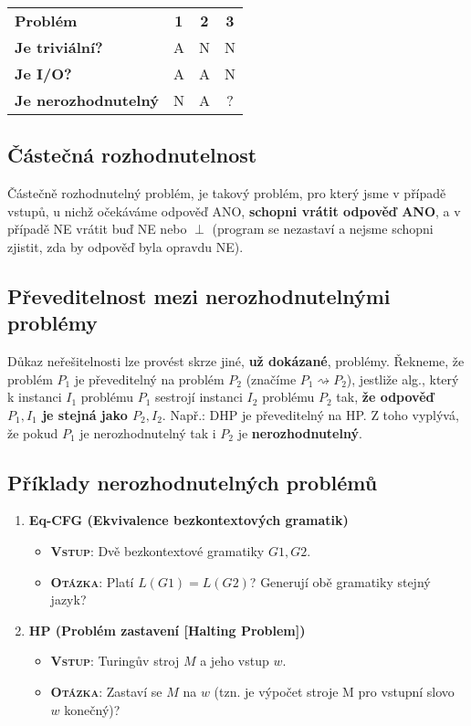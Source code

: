 \begin{table}[H]
    \centering
    \begin{tabular}{l|c|c|c}
        \textbf{Problém}            & \textbf{1} & \textbf{2} & \textbf{3} \\\hhline
        \textbf{Je triviální?}      & A          & N          & N          \\
        \textbf{Je I/O?}            & A          & A          & N          \\
        \textbf{Je nerozhodnutelný} & N          & A          & ?
    \end{tabular}
\end{table}

\subsection{Částečná rozhodnutelnost}
Částečně rozhodnutelný problém, je takový problém, pro který jsme v případě vstupů, u nichž očekáváme odpověď ANO, \textbf{schopni vrátit odpověď ANO}, a v případě NE vrátit buď NE nebo $\perp$ (program se nezastaví a nejsme schopni zjistit, zda by odpověď byla opravdu NE).

\subsection{Převeditelnost mezi nerozhodnutelnými problémy}
Důkaz neřešitelnosti lze provést skrze jiné, \textbf{už dokázané}, problémy. Řekneme, že problém $P_1$ je převeditelný na problém $P_2$ (značíme $P_1 \rightsquigarrow P_2$), jestliže alg., který k instanci $I_1$ problému $P_1$ sestrojí instanci $I_2$ problému $P_2$ tak, \textbf{že odpověď $P_1, I_1$ je stejná jako $P_2, I_2$}. Např.: DHP je převeditelný na HP.  Z toho vyplývá, že pokud $P_1$ je nerozhodnutelný tak i $P_2$ je \textbf{nerozhodnutelný}.

\subsection{Příklady nerozhodnutelných problémů}
\begin{enumerate}
    \item \textbf{Eq-CFG (Ekvivalence bezkontextových gramatik)}
          \begin{itemize}
              \item \textbf{\textsc{Vstup}}: Dvě bezkontextové gramatiky $G1, G2$.
              \item \textbf{\textsc{Otázka}}: Platí $L(G1) = L(G2)$? Generují obě gramatiky stejný jazyk?
          \end{itemize}
    \item \textbf{HP (Problém zastavení [Halting Problem])}
          \begin{itemize}
              \item \textbf{\textsc{Vstup}}: Turingův stroj $M$ a jeho vstup $w$.
              \item \textbf{\textsc{Otázka}}: Zastaví se $M$ na $w$ (tzn. je výpočet stroje M pro vstupní slovo $w$ konečný)?
          \end{itemize}
\end{enumerate}

